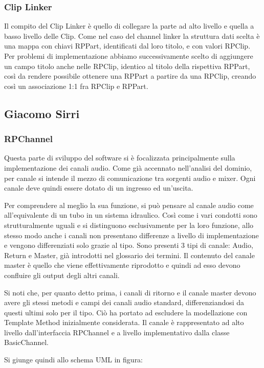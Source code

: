 \documentclass[a4paper,12pt]{report}
\begin{document}
\subsubsection{Clip Linker}
Il compito del Clip Linker è quello di collegare la parte ad alto livello e quella a basso livello delle Clip. Come nel caso del channel linker la struttura dati scelta è una mappa con chiavi RPPart, identificati dal loro titolo, e con valori RPClip. Per problemi di implementazione abbiamo successivamente scelto di aggiungere un campo titolo anche nelle RPClip, identico al titolo della rispettiva RPPart, così da rendere possibile ottenere una RPPart a partire da una RPClip, creando così un associazione 1:1 fra RPClip e RPPart.
\endsubsubsection

\subsection{Giacomo Sirri}
\subsubsection{RPChannel}
Questa parte di sviluppo del software si è focalizzata principalmente sulla implementazione dei canali audio. Come già accennato nell’analisi del dominio, per canale si intende il mezzo di comunicazione tra sorgenti audio e mixer. Ogni canale deve quindi essere dotato di un ingresso ed un’uscita. 

Per comprendere al meglio la sua funzione, si può pensare al canale audio come all’equivalente di un tubo in un sistema idraulico. Così come i vari condotti sono strutturalmente uguali e si distinguono esclusivamente per la loro funzione, allo stesso modo anche i canali non presentano differenze a livello di implementazione e vengono differenziati solo grazie al tipo. Sono presenti 3 tipi di canale: Audio, Return e Master, già introdotti nel glossario dei termini.
Il contenuto del canale master è quello che viene effettivamente riprodotto e quindi ad esso devono confluire gli output degli altri canali. 

Si noti che, per quanto detto prima, i canali di ritorno e il canale master devono avere gli stessi metodi e campi dei canali audio standard, differenziandosi da questi ultimi solo per il tipo. Ciò ha portato ad escludere la modellazione con Template Method inizialmente considerata. Il canale è rappresentato ad alto livello dall’interfaccia RPChannel e a livello implementativo dalla classe BasicChannel. 

Si giunge quindi allo schema UML in figura:
\endsubsubsection
\end{document}
